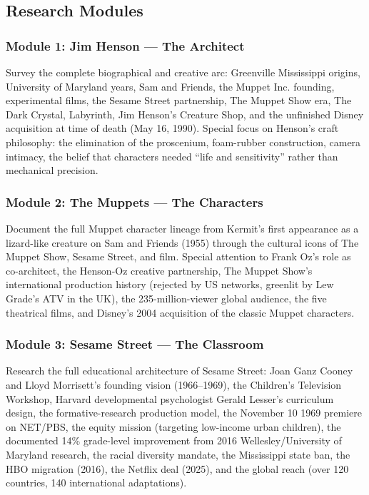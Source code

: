 \documentclass[11pt,letterpaper]{article}
\begin{document}
\subsection{Research Modules}

\subsubsection{Module 1: Jim Henson --- The Architect}
Survey the complete biographical and creative arc: Greenville Mississippi origins, University of Maryland years, Sam and Friends, the Muppet Inc. founding, experimental films, the Sesame Street partnership, The Muppet Show era, The Dark Crystal, Labyrinth, Jim Henson's Creature Shop, and the unfinished Disney acquisition at time of death (May 16, 1990). Special focus on Henson's craft philosophy: the elimination of the proscenium, foam-rubber construction, camera intimacy, the belief that characters needed ``life and sensitivity'' rather than mechanical precision.

\subsubsection{Module 2: The Muppets --- The Characters}
Document the full Muppet character lineage from Kermit's first appearance as a lizard-like creature on Sam and Friends (1955) through the cultural icons of The Muppet Show, Sesame Street, and film. Special attention to Frank Oz's role as co-architect, the Henson-Oz creative partnership, The Muppet Show's international production history (rejected by US networks, greenlit by Lew Grade's ATV in the UK), the 235-million-viewer global audience, the five theatrical films, and Disney's 2004 acquisition of the classic Muppet characters.

\subsubsection{Module 3: Sesame Street --- The Classroom}
Research the full educational architecture of Sesame Street: Joan Ganz Cooney and Lloyd Morrisett's founding vision (1966--1969), the Children's Television Workshop, Harvard developmental psychologist Gerald Lesser's curriculum design, the formative-research production model, the November 10 1969 premiere on NET/PBS, the equity mission (targeting low-income urban children), the documented 14\% grade-level improvement from 2016 Wellesley/University of Maryland research, the racial diversity mandate, the Mississippi state ban, the HBO migration (2016), the Netflix deal (2025), and the global reach (over 120 countries, 140 international adaptations).
\end{document}
